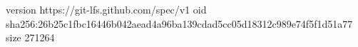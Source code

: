 version https://git-lfs.github.com/spec/v1
oid sha256:26b25c1fbc16446b042aead4a96ba139cdad5cc05d18312c989e74f5f1d51a77
size 271264
